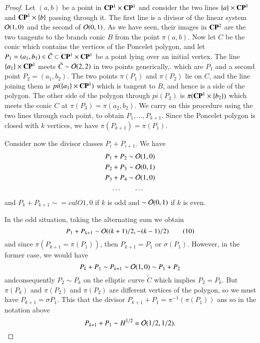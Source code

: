 \begin{proof}
Let $(a, b)$ be a point in $\mathbf{C}\mathbf{P}^{1} \times \mathbf{C}\mathbf{P}^{1}$ and consider the two lines $\{a\} \times \mathbf{C}\mathbf{P}^{1}$ and $\mathbf{C}\mathbf{P}^{1} \times \{b\}$ passing through it. The first line is a divisor of the linear system $\mathcal{O}(1,0)$ and the second of $\mathcal{O}(0,1)$. As we have seen, their images in $\mathbf{C}\mathbf{P}^{2}$ are the two tangents to the branch conic $B$ from the point $\pi(a, b)$. Now let $C$ be the conic which contains the vertices of the Poncelet polygon, and let $P_{1} =(a_{1}, b_{1}) \in \tilde{C} \subset \mathbf{C}\mathbf{P}^{1} \times \mathbf{C}\mathbf{P}^{1}$ be a point lying over an initial vertex. The line $\{a_{1}\} \times \mathbf{C}\mathbf{P}^{1}$ meets $\tilde{C}\sim \mathcal{O}(2,2)$ in two points generically,. which are $P_{1}$ and a second point $P_{2} = (a_{1}, b_{2})$. The two points $\pi(P_{1})$ and $\pi(P_{2})$ lie on $C$, and the line joining them is $pi(\{a_{1}\} \times \mathbf{C}\mathbf{P}^{1})$ which is tangent to $B$, and hence is a side of the polygon. The other side of the polygon through $pi(P_{2})$ is $\pi(\mathbf{C}\mathbf{P}^{1} \times\{b_{2}\})$ which meets the conic $C$ at $\pi(P_{3}) = \pi(a_{2}, b_{2})$. We carry on this procedure using the two lines through each point, to obtain $P_{1}, \ldots, P_{k+1}$. Since the Poncelet polygon is closed with $k$ vertices, we have $\pi(P_{k+1}) = \pi(P_{1})$.

Consider now the divisor classes $P_{i} + P_{i+1}$. We have
\begin{align*}
P_{1}+ P_{2} &\sim \mathcal{O}(1,0)\\
P_{2}+ P_{3} &\sim \mathcal{O}(0,1)\\
P_{3}+ P_{4} &\sim \mathcal{O}(1,0)\\
\ldots  \quad     & \quad \ldots
\end{align*}
and $P_{k} + P_{k+1} \sim =calO{1, 0}$ if $k$ is odd and $\sim \mathcal{O}(0,1)$ if $k$ is even.

In the odd situation, taking the alternating sum we obtain
\begin{equation*}\label{chap7-eq-10}
P_{1} +P_{k+1} \sim \mathcal{O} ((k+1)/2, -(k-1)/2)\tag{10}
\end{equation*}
and since $\pi(P_{k+1} = \pi(P_{1}))$, then $P_{k+1} = P_{1}$ or  $\sigma(P_{1})$. However, in the former case, we would have
$$
P_{k}+P_{1}\sim P_{k+1}\sim \mathcal{O}(1,0)\sim P_{1}+P_{2}
$$
and\pageoriginale consequently $P_{2}\sim P_{k}$ on the elliptic curve $\tilde{C}$ which implies $P_{2} = P_{k}$. But $\pi(P_{k})$ and $\pi(P_{2})$ and $\pi(P_{2})$ are different vertices of the polygon, so we must have $P_{k+1} = \sigma P_{1}$. This that the divisor $P_{k+1} +P_{1} = \pi^{-1}(\pi(P_{1}))$ ans so in the notation above
$$
P_{k+1} + P_{1}\sim H^{1/2} = \mathcal{O}(1/2, 1/2).
$$


\end{proof}

